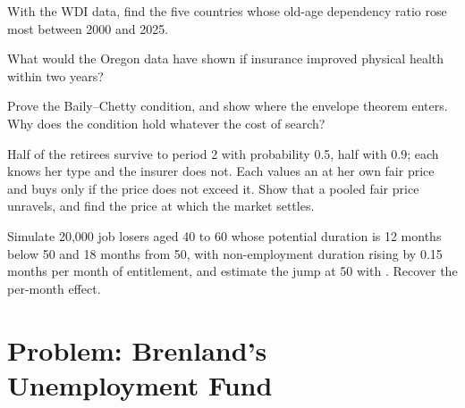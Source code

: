 \begin{exercise}[$\star\star$]\label{exo:b3:social-insurance:8}
With the WDI data, find the five countries whose old-age dependency ratio rose most
between 2000 and 2025.
\end{exercise}

\begin{exercise}[$\star\star$]\label{exo:b3:social-insurance:9}
What would the Oregon data have shown if insurance improved physical health within
two years?
\end{exercise}

\begin{exercise}[$\star\star\star$]\label{exo:b3:social-insurance:10}
Prove the Baily--Chetty condition, and show where the envelope theorem enters. Why
does the condition hold whatever the cost of search?
\end{exercise}

\begin{exercise}[$\star\star\star$]\label{exo:b3:social-insurance:11}
Half of the retirees survive to period 2 with probability 0.5, half with 0.9; each
knows her type and the insurer does not. Each values an  at her own fair
price and buys only if the price does not exceed it. Show that a pooled fair price
unravels, and find the price at which the market settles.
\end{exercise}

\begin{exercise}[$\star\star\star$]\label{exo:b3:social-insurance:12}
Simulate 20{,}000 job losers aged 40 to 60 whose potential duration is 12 months below 50
and 18 months from 50, with non-employment duration rising by 0.15 months per month of
entitlement, and estimate the jump at 50 with . Recover the
per-month effect.
\end{exercise}

\section{Problem: Brenland's Unemployment Fund}\label{sec:b3:social-insurance:problem}

